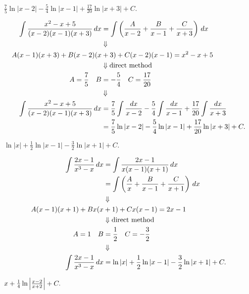     {$ \frac{7}{5}\ln|x-2| - \frac{5}{4}\ln|x-1| + \frac{17}{20}\ln|x+3| + C. $}
    
    \begin{align*}
        \int \frac{x^2-x+5}{(x-2)(x-1)(x+3)} \, dx
            &= \int \left( \frac{A}{x-2} + \frac{B}{x-1} + \frac{C}{x+3} \right)
                \, dx \\
            &\mathrel{\Downarrow} \\
        A(x-1)(x+3) + B(x-2)(x&+3) + C(x-2)(x-1) = x^2 - x + 5 \\
            &\mathrel{\Downarrow} \text{direct method} \\
        A = \frac{7}{5} \quad B &= -\frac{5}{4} \quad C = \frac{17}{20} \\
            &\mathrel{\Downarrow} \\
        \int \frac{x^2-x+5}{(x-2)(x-1)(x+3)} \, dx
            &= \frac{7}{5} \int \frac{dx}{x-2} - \frac{5}{4} \int \frac{dx}{x-1}
                + \frac{17}{20} \int \frac{dx}{x+3} \\
            &= \frac{7}{5}\ln|x-2| - \frac{5}{4}\ln|x-1| + \frac{17}{20}\ln|x+3|
                + C.
    \end{align*}
    
    {$ \ln|x| + \frac{1}{2}\ln|x-1| - \frac{3}{2}\ln|x+1| + C. $}
    
    \begin{align*}
        \int \frac{2x-1}{x^3-x} \, dx
            &= \int \frac{2x - 1}{x (x-1) (x+1)}\, dx \\
            &= \int \left( \frac{A}{x} + \frac{B}{x-1} + \frac{C}{x+1} \right) \, dx \\
            &\mathrel{\Downarrow} \\
        A(x-1)(x+1) + Bx(x&+1) + Cx(x-1) = 2x-1 \\
            &\mathrel{\Downarrow} \text{direct method} \\
        A = 1 \quad B &= \frac{1}{2} \quad C = -\frac{3}{2} \\
            &\mathrel{\Downarrow} \\
        \int \frac{2x-1}{x^3-x} \, dx
            &= \ln|x| + \frac{1}{2}\ln|x-1| - \frac{3}{2}\ln|x+1| + C.
    \end{align*}
    
    {$ x + \frac{1}{4} \ln\left\lvert \frac{x-2}{x+2} \right\rvert + C. $}
    
